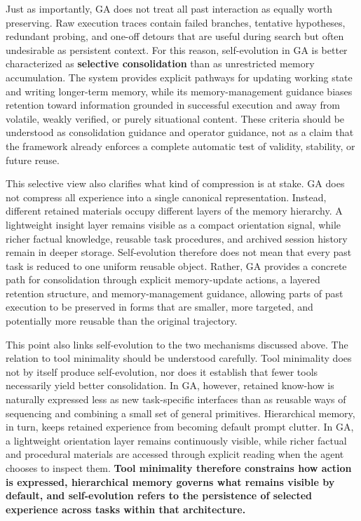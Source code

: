 Just as importantly, GA does not treat all past interaction as equally worth preserving. Raw execution traces contain failed branches, tentative hypotheses, redundant probing, and one-off detours that are useful during search but often undesirable as persistent context. For this reason, self-evolution in GA is better characterized as \textbf{selective consolidation} than as unrestricted memory accumulation. The system provides explicit pathways for updating working state and writing longer-term memory, while its memory-management guidance biases retention toward information grounded in successful execution and away from volatile, weakly verified, or purely situational content. These criteria should be understood as consolidation guidance and operator guidance, not as a claim that the framework already enforces a complete automatic test of validity, stability, or future reuse.

This selective view also clarifies what kind of compression is at stake. GA does not compress all experience into a single canonical representation. Instead, different retained materials occupy different layers of the memory hierarchy. A lightweight insight layer remains visible as a compact orientation signal, while richer factual knowledge, reusable task procedures, and archived session history remain in deeper storage. Self-evolution therefore does not mean that every past task is reduced to one uniform reusable object. Rather, GA provides a concrete path for consolidation through explicit memory-update actions, a layered retention structure, and memory-management guidance, allowing parts of past execution to be preserved in forms that are smaller, more targeted, and potentially more reusable than the original trajectory.

This point also links self-evolution to the two mechanisms discussed above. The relation to tool minimality should be understood carefully. Tool minimality does not by itself produce self-evolution, nor does it establish that fewer tools necessarily yield better consolidation. In GA, however, retained know-how is naturally expressed less as new task-specific interfaces than as reusable ways of sequencing and combining a small set of general primitives. Hierarchical memory, in turn, keeps retained experience from becoming default prompt clutter. In GA, a lightweight orientation layer remains continuously visible, while richer factual and procedural materials are accessed through explicit reading when the agent chooses to inspect them. \textbf{Tool minimality therefore constrains how action is expressed, hierarchical memory governs what remains visible by default, and self-evolution refers to the persistence of selected experience across tasks within that architecture.}

